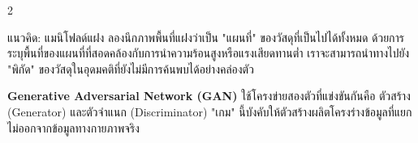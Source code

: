 \begin{paracol}{2}
\begin{thai}
\begin{aibox}{แนวคิด: แมนิโฟลด์แฝง}
ลองนึกภาพพื้นที่แฝงว่าเป็น "แผนที่" ของวัสดุที่เป็นไปได้ทั้งหมด ด้วยการระบุพื้นที่ของแผนที่ที่สอดคล้องกับการนำความร้อนสูงหรือแรงเสียดทานต่ำ เราจะสามารถนำทางไปยัง "พิกัด" ของวัสดุในอุดมคติที่ยังไม่มีการค้นพบได้อย่างคล่องตัว
\end{aibox}

\textbf{Generative Adversarial Network (GAN)} ใช้โครงข่ายสองตัวที่แข่งขันกันคือ ตัวสร้าง (Generator) และตัวจำแนก (Discriminator) "เกม" นี้บังคับให้ตัวสร้างผลิตโครงร่างข้อมูลที่แยกไม่ออกจากข้อมูลทางกายภาพจริง
\end{thai}
\end{paracol}

